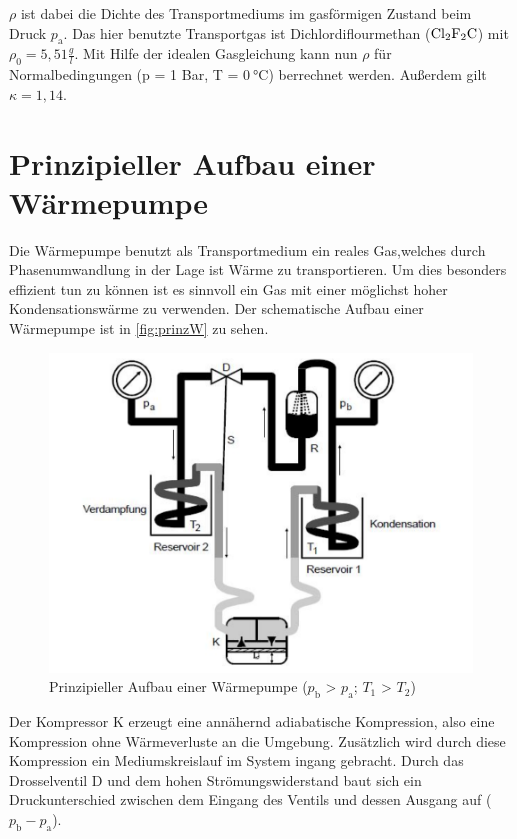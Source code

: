 $\rho$ ist dabei die Dichte des Transportmediums im gasförmigen Zustand beim Druck $p_\text{a}$.
Das hier benutzte Transportgas ist Dichlordiflourmethan ($\ce{Cl2F2C}$) mit $\rho_0 = 5,51\frac{g}{l}$. 
Mit Hilfe der idealen Gasgleichung kann nun $\rho$ für Normalbedingungen (p = 1 Bar, T = $\SI{0}{\celsius}$) berrechnet werden.
Außerdem gilt $\kappa=1,14$.

        \section{Prinzipieller Aufbau einer Wärmepumpe}
    	Die Wärmepumpe benutzt als Transportmedium ein reales Gas,welches durch Phasenumwandlung in der Lage ist Wärme zu transportieren. 
        Um dies besonders effizient tun zu können ist es sinnvoll ein Gas mit einer möglichst hoher Kondensationswärme zu verwenden. 
        Der schematische Aufbau einer Wärmepumpe ist in \autoref{fig:prinzW} zu sehen.
        \begin{figure}
            \centering
               \includegraphics[scale=0.75]{aufbau_1.pdf}
               \caption{Prinzipieller Aufbau einer Wärmepumpe ($p_\text{b}$ > $p_\text{a}$; $T_1$ > $T_2$)}
               \label{fig:prinzW}
        \end{figure}
        Der Kompressor K erzeugt eine annähernd adiabatische Kompression, also eine Kompression ohne Wärmeverluste an die Umgebung. 
        Zusätzlich wird durch diese Kompression ein Mediumskreislauf im System ingang gebracht. Durch das Drosselventil D und dem hohen Strömungswiderstand baut sich ein Druckunterschied
        zwischen dem Eingang des Ventils und dessen Ausgang auf ($p_\text{b}-p_\text{a}$).

